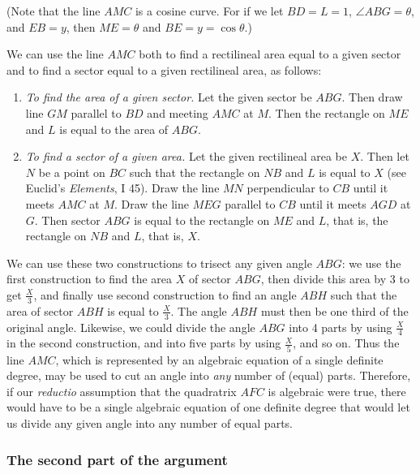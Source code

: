 \documentclass[twoside,openright]{article}
\begin{document}
\label{begca}
(Note that the line $AMC$ is a cosine curve.  For if we let
$BD = L = 1$, $\angle ABG = \theta$, and $EB = y$, then $ME = \theta$
and $BE = y = \cos \theta.$)

We can use the line $AMC$ both to find a rectilineal area equal to a
given sector and to find a sector equal to a given rectilineal area,
as follows:
\begin{enumerate}
\item {\em To find the area of a given sector.}  Let the given sector
  be $ABG$.  Then draw line $GM$ parallel to $BD$ and meeting $AMC$ at
  $M$.  Then the rectangle on $ME$ and $L$ is equal to the area of
  $ABG$.
\item {\em To find a sector of a given area.}  Let the given
  rectilineal area be $X$.  Then let $N$ be a point on $BC$ such that
  the rectangle on $NB$ and $L$ is equal to $X$ (see Euclid's {\em
    Elements}, I 45).  Draw the line $MN$ perpendicular to $CB$ until
  it meets $AMC$ at $M$.  Draw the line $MEG$ parallel to $CB$ until
  it meets $AGD$ at $G$.  Then sector $ABG$ is equal to the rectangle
  on $ME$ and $L$, that is, the rectangle on $NB$ and $L$, that is,
  $X$.
\end{enumerate}
We can use these two constructions to trisect any given angle $ABG$:
we use the first construction to find the area $X$ of sector $ABG$,
then divide this area by 3 to get $\frac{X}{3}$, and finally use
second construction to find an angle $ABH$ such that the area of
sector $ABH$ is equal to $\frac{X}{3}$.  The angle $ABH$ must then be
one third of the original angle.  Likewise, we could divide the angle
$ABG$ into 4 parts by using $\frac{X}{4}$ in the second construction,
and into five parts by using $\frac{X}{5}$, and so on.  Thus the line
$AMC$, which is represented by an algebraic equation of a single
definite degree, may be used to cut an angle into {\em any} number of
(equal) parts.  Therefore, if our {\em reductio} assumption that the
quadratrix $AFC$ is algebraic were true, there would have to be a
single algebraic equation of one definite degree that would let us
divide any given angle into any number of equal parts.
\label{endca}

\subsubsection*{The second part of the argument}
\end{document}
